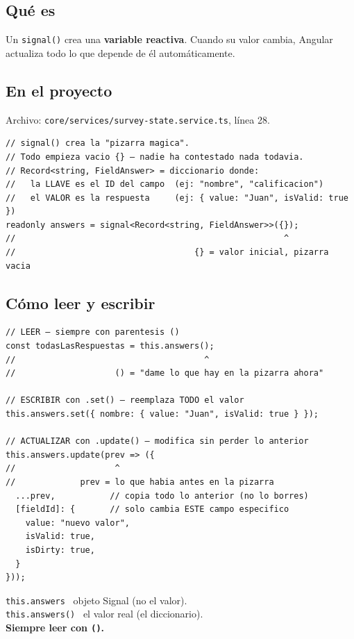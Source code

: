 \documentclass[12pt, a4paper]{article}
\begin{document}
\subsection{ Qué es}
Un \texttt{signal()} crea una \textbf{variable reactiva}. Cuando su valor cambia,
Angular actualiza todo lo que depende de él automáticamente.

\subsection{ En el proyecto}
Archivo: \textcolor{morado}{\texttt{core/services/survey-state.service.ts}}, línea 28.

\begin{lstlisting}
// signal() crea la "pizarra magica".
// Todo empieza vacio {} — nadie ha contestado nada todavia.
// Record<string, FieldAnswer> = diccionario donde:
//   la LLAVE es el ID del campo  (ej: "nombre", "calificacion")
//   el VALOR es la respuesta     (ej: { value: "Juan", isValid: true })
readonly answers = signal<Record<string, FieldAnswer>>({});
//                                                      ^
//                                    {} = valor inicial, pizarra vacia
\end{lstlisting}

\subsection{ Cómo leer y escribir}

\begin{lstlisting}
// LEER — siempre con parentesis ()
const todasLasRespuestas = this.answers();
//                                      ^
//                    () = "dame lo que hay en la pizarra ahora"

// ESCRIBIR con .set() — reemplaza TODO el valor
this.answers.set({ nombre: { value: "Juan", isValid: true } });

// ACTUALIZAR con .update() — modifica sin perder lo anterior
this.answers.update(prev => ({
//                    ^
//             prev = lo que habia antes en la pizarra
  ...prev,           // copia todo lo anterior (no lo borres)
  [fieldId]: {       // solo cambia ESTE campo especifico
    value: "nuevo valor",
    isValid: true,
    isDirty: true,
  }
}));
\end{lstlisting}

\begin{tcolorbox}[regla, title={\emoji{pushpin} \emoji{star} Regla de Oro}]
  \texttt{this.answers} \textrightarrow\ objeto Signal (no el valor).\\
  \texttt{this.answers()} \textrightarrow\ el valor real (el diccionario).\\[0.2cm]
  \textbf{Siempre leer con \texttt{()}.}
\end{tcolorbox}
\end{document}
